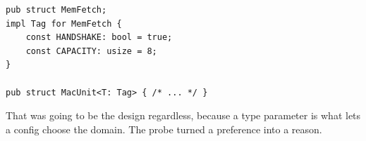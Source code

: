 \begin{lstlisting}[caption={A tag is a type with associated constants, because an attribute on a block is not stable.},label={lst:tag}]
pub struct MemFetch;
impl Tag for MemFetch {
    const HANDSHAKE: bool = true;
    const CAPACITY: usize = 8;
}

pub struct MacUnit<T: Tag> { /* ... */ }
\end{lstlisting}

That was going to be the design regardless, because a type parameter is
what lets a config choose the domain. The probe turned a preference into a
reason.
